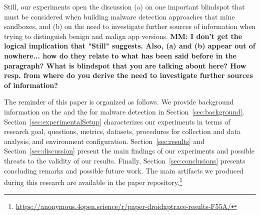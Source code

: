 %
Still, 
our experiments open the discussion (a) on one important blindspot that must be considered when building 
malware detection approaches that mine sandboxes, and (b) on the need to investigate further sources of
information when trying to distinguish benign and malign app versions.
{\bf MM: I don't get the logical implication that "Still" suggests. Also, (a) and (b) appear out of nowhere... how do they relate to what has been said before in the paragraph? What is blindspot that you are talking about here? How resp. from where do you derive the need to investigate further sources of information?}

The reminder of this paper is organized as follows. 
We provide background information on the \mas and the \mas for malware detection in
Section~\ref{sec:background}. Section~\ref{sec:experimentalSetup}
characterizes our experiments in terms of research goal, questions, metrics, datasets, procedures for collection and data analysis, and environment configuration. Section~\ref{sec:results} and Section~\ref{sec:discussion} present the main findings of our experiments and possible threats to the validity of our results. Finally,
Section~\ref{sec:conclusions} presents concluding remarks and possible future
work. The main artifacts we produced during this research are available in the
paper repository.\footnote{\url{https://anonymous.4open.science/r/paper-droidxptrace-results-F55A/}}
